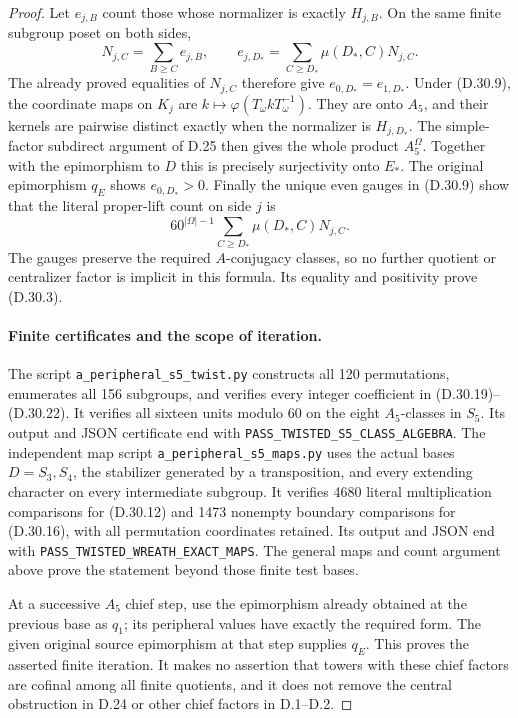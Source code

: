 \begin{proof}
Let $e_{j,B}$ count those whose normalizer
is exactly $H_{j,B}$.  On the same finite
subgroup poset on both sides,
\[
 N_{j,C}=\sum_{B\geq C}e_{j,B},\qquad
 e_{j,D_*}=\sum_{C\geq D_*}\mu(D_*,C)N_{j,C}.
 \tag{D.30.28}
\]
The already proved equalities of $N_{j,C}$
therefore give $e_{0,D_*}=e_{1,D_*}$.
Under \textup{(D.30.9)}, the coordinate
maps on $K_j$ are
$k\mapsto\varphi(T_\omega kT_\omega^{-1})$.
They are onto $A_5$, and their kernels
are pairwise distinct exactly when the
normalizer is $H_{j,D_*}$.
The simple-factor subdirect argument of
D.25 then gives the whole product
$A_5^{\Omega}$.  Together with the
epimorphism to $D$ this is precisely
surjectivity onto $E_*$.
The original epimorphism $q_E$ shows
$e_{0,D_*}>0$.
Finally the unique even gauges in
\textup{(D.30.9)} show that the literal
proper-lift count on side $j$ is
\[
            60^{|\Omega|-1}
              \sum_{C\geq D_*}\mu(D_*,C)N_{j,C}.
 \tag{D.30.29}
\]
The gauges preserve the required
$A$-conjugacy classes, so no further
quotient or centralizer factor is
implicit in this formula.
Its equality and positivity prove
\textup{(D.30.3)}.

\paragraph{Finite certificates and the scope of iteration.}
The script \texttt{a\_peripheral\_s5\_twist.py}
constructs all 120 permutations, enumerates
all 156 subgroups, and verifies every
integer coefficient in
\textup{(D.30.19)--(D.30.22)}.
It verifies all sixteen units modulo
$60$ on the eight $A_5$-classes in
$S_5$.  Its output and JSON certificate
end with
\texttt{PASS\_TWISTED\_S5\_CLASS\_ALGEBRA}.
The independent map script
\texttt{a\_peripheral\_s5\_maps.py}
uses the actual bases $D=S_3,S_4$,
the stabilizer generated by a transposition,
and every extending character on every
intermediate subgroup.  It verifies
4680 literal multiplication comparisons
for \textup{(D.30.12)} and 1473 nonempty
boundary comparisons for
\textup{(D.30.16)}, with all permutation
coordinates retained.  Its output and
JSON end with
\texttt{PASS\_TWISTED\_WREATH\_EXACT\_MAPS}.
The general maps and count argument above
prove the statement beyond those finite
test bases.

At a successive $A_5$ chief step, use the
epimorphism already obtained at the
previous base as $q_1$; its peripheral
values have exactly the required form.
The given original source epimorphism
at that step supplies $q_E$.  This
proves the asserted finite iteration.
It makes no assertion that towers with
these chief factors are cofinal among
all finite quotients, and it does not
remove the central obstruction in D.24
or other chief factors in D.1--D.2.
\end{proof}
